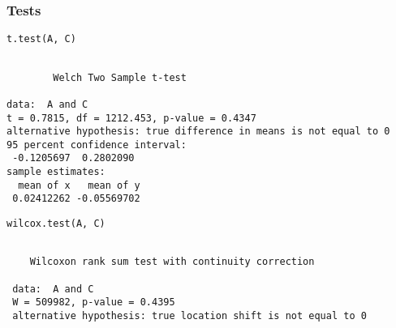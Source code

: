\documentclass{beamer}
\begin{document}
\begin{frame}[fragile]
\frametitle{Tests}
\label{sec-2-7}


\lstset{language=R}
\begin{lstlisting}
t.test(A, C)
\end{lstlisting}


\begin{verbatim}

        Welch Two Sample t-test

data:  A and C 
t = 0.7815, df = 1212.453, p-value = 0.4347
alternative hypothesis: true difference in means is not equal to 0 
95 percent confidence interval:
 -0.1205697  0.2802090 
sample estimates:
  mean of x   mean of y 
 0.02412262 -0.05569702
\end{verbatim}


\lstset{language=R}
\begin{lstlisting}
wilcox.test(A, C)
\end{lstlisting}

\begin{verbatim}
 
 	Wilcoxon rank sum test with continuity correction
 
 data:  A and C 
 W = 509982, p-value = 0.4395
 alternative hypothesis: true location shift is not equal to 0
\end{verbatim}
\end{frame}
\end{document}
